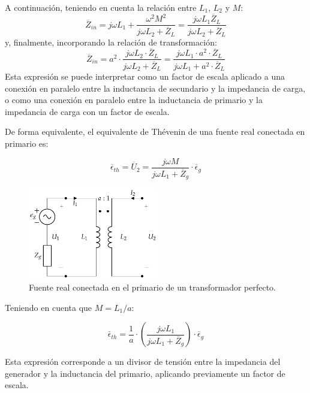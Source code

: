 A continuación, teniendo en cuenta la relación entre $L_1$, $L_2$ y
$M$:
\[
  \overline{Z}_{in} = j\omega L_1 + \frac{\omega^2 M^2}{j\omega L_2 +
    \overline{Z}_L} = \frac{j\omega L_1 \overline{Z}_L}{j\omega L_2 +
    \overline{Z}_L}
\]
y, finalmente, incorporando la relación de transformación:
\begin{equation}
  \label{eq:trafo-perfecto-impedancia-entrada}
  \overline{Z}_{in} =  a^2 \cdot \frac{j \omega L_2 \cdot \overline{Z}_L}{j\omega L_2 + \overline{Z}_L} =  \frac{j \omega L_1 \cdot a^2 \cdot \overline{Z}_L}{j\omega L_1 + a^2 \cdot \overline{Z}_L}
\end{equation}
Esta expresión se puede interpretar como un factor de escala aplicado
a una conexión en paralelo entre la inductancia de secundario y la
impedancia de carga, o como una conexión en paralelo entre la
inductancia de primario y la impedancia de carga con un factor de
escala.

De forma equivalente, el equivalente de Thévenin de una fuente real
conectada en primario es:

\[
  \overline{\epsilon}_{th} = \overline{U}_2 = \frac{j\omega M}{j\omega
    L_1 + \overline{Z}_g} \cdot \overline{\epsilon}_g
\]

\begin{figure}
  \centering
  \includegraphics[height=4cm]{../figs/Trafo_Perfecto_FuentePrimario.pdf}
  \caption{Fuente real conectada en el primario de un transformador perfecto.}
  \label{fig:trafo-perfecto-fuente-primario}
\end{figure}
Teniendo en cuenta que $M = L_1/a$:

\begin{equation}
  \label{eq:trafo-perfecto-tension-thevenin}
  \overline{\epsilon}_{th} = \frac{1}{a} \cdot \left(\frac{j\omega
      L_1}{j\omega L_1 + \overline{Z}_g}\right) \cdot
  \overline{\epsilon}_g
\end{equation}

Esta expresión corresponde a un divisor de tensión entre la impedancia
del generador y la inductancia del primario, aplicando previamente un
factor de escala.

